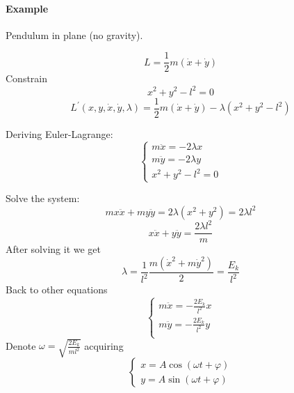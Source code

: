 \paragraph{Example}
Pendulum in plane (no gravity).

$$L = \frac{1}{2} m\left( \dot{x} + \dot{y} \right)$$
Constrain
$$x^2+y^2-l^2 = 0$$
$$L^\prime (x,y,\dot{x}, \dot{y}, \lambda) = \frac{1}{2} m\left( \dot{x} + \dot{y} \right) - \lambda(x^2+y^2-l^2)$$

Deriving Euler-Lagrange:
$$\begin{cases}
m\ddot{x} = -2\lambda x\\
m\ddot{y} = -2\lambda y\\
x^2+y^2-l^2 = 0
\end{cases}$$

Solve the system:
$$mx\ddot{x} + my\ddot{y} = 2\lambda(x^2+y^2 ) = 2\lambda l^2$$
$$x\ddot{x} + y\ddot{y} = \frac{2\lambda l^2}{m}$$
After solving it we get
$$\lambda = \frac{1}{l^2} \frac{m(\dot{x}^2 + m\dot{y}^2)}{2} = \frac{E_k}{l^2}$$
Back to other equations
$$\begin{cases}
m\ddot{x} = -\frac{2E_k}{l^2} x\\
m\ddot{y} = -\frac{2E_k}{l^2} y\\
\end{cases}$$
Denote $\omega = \sqrt{\frac{2E_k}{ml^2}}$ acquiring
$$\begin{cases}
x = A \cos \left( \omega t + \varphi \right)\\
y = A \sin \left( \omega t + \varphi \right)
\end{cases}$$